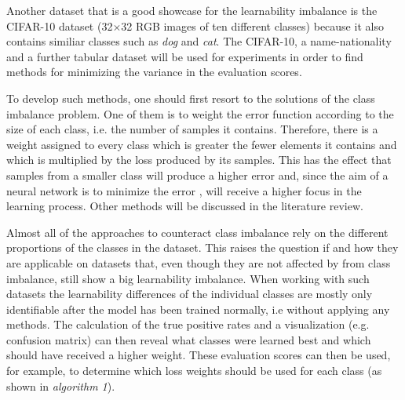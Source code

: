 \documentclass[journal]{IEEEtran}
\begin{document}
Another dataset that is a good showcase for the learnability imbalance is the CIFAR-10 \cite{krizhevsky2009learning} dataset (32$\times$32 RGB images of ten different classes) because it also contains similiar classes such as \emph{dog} and \emph{cat}.
The CIFAR-10, a name-nationality and a further tabular dataset will be used for experiments in order to find methods for minimizing the variance in the evaluation scores.

To develop such methods, one should first resort to the solutions of the class imbalance problem.
One of them is to weight the error function \cite{cui2019class} according to the size of each class, i.e. the number of samples it contains.
Therefore, there is a weight assigned to every class which is greater the fewer elements it contains and which is multiplied by the loss produced by its samples. %
This has the effect that samples from a smaller class will produce a higher error and, since the aim of a neural network is to minimize the error \cite{rumelhart1985learning}, will receive a higher focus in the learning process.
Other methods will be discussed in the literature review.

Almost all of the approaches to counteract class imbalance rely on the different proportions of the classes in the dataset.
This raises the question if and how they are applicable on datasets that, even though they are not affected by from class imbalance, still show a big learnability imbalance.
When working with such datasets the learnability differences of the individual classes are mostly only identifiable after the model has been trained normally, i.e without applying any methods. %
The calculation of the true positive rates and a visualization (e.g. confusion matrix) can then reveal what classes were learned best and which should have received a higher weight.
These evaluation scores can then be used, for example, to determine which loss weights should be used for each class (as shown in \emph{algorithm 1}).
\end{document}
